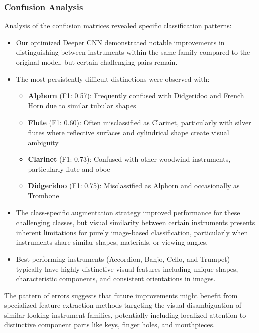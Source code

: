 \subsubsection{Confusion Analysis}
Analysis of the confusion matrices revealed specific classification patterns:
\begin{itemize}
    \item Our optimized Deeper CNN demonstrated notable improvements in distinguishing between instruments within the same family compared to the original model, but certain challenging pairs remain.
    
    \item The most persistently difficult distinctions were observed with:
        \begin{itemize}
            \item \textbf{Alphorn} (F1: 0.57): Frequently confused with Didgeridoo and French Horn due to similar tubular shapes
            
            \item \textbf{Flute} (F1: 0.60): Often misclassified as Clarinet, particularly with silver flutes where reflective surfaces and cylindrical shape create visual ambiguity
            
            \item \textbf{Clarinet} (F1: 0.73): Confused with other woodwind instruments, particularly flute and oboe
            
            \item \textbf{Didgeridoo} (F1: 0.75): Misclassified as Alphorn and occasionally as Trombone
        \end{itemize}
    
    \item The class-specific augmentation strategy improved performance for these challenging classes, but visual similarity between certain instruments presents inherent limitations for purely image-based classification, particularly when instruments share similar shapes, materials, or viewing angles.
    
    \item Best-performing instruments (Accordion, Banjo, Cello, and Trumpet) typically have highly distinctive visual features including unique shapes, characteristic components, and consistent orientations in images.
\end{itemize}

The pattern of errors suggests that future improvements might benefit from specialized feature extraction methods targeting the visual disambiguation of similar-looking instrument families, potentially including localized attention to distinctive component parts like keys, finger holes, and mouthpieces.
